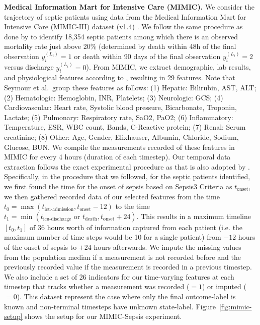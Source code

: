 \documentclass[pmlr,twocolumn,10pt]{jmlr} %
\begin{document}
\textbf{Medical Information Mart for Intensive Care (MIMIC).}
We consider the trajectory of septic patients using data from the Medical Information Mart
for Intensive Care (MIMIC-III) dataset (v1.4) \citep{johnson2018mimic}. We follow the same procedure as done by \citet{komorowski2018artificial} to identify 18,354 septic patients among which there is an observed mortality rate just above 20\% (determined by death within 48h of the final observation $y_i^{(L_i)}=1$ or death within 90 days of the final observation $y_i^{(L_i)}=2$ versus discharge $y_i^{(L_i)}=0$).
From MIMIC, we extract demographic, lab results, and physiological features according to \citet{seymour2019derivation}, resulting in 29 features. Note that Seymour et al.~group these features as follows: (1) Hepatic: Bilirubin, AST, ALT; (2) Hematologic: Hemoglobin, INR, Platelets; (3) Neurologic: GCS; (4) Cardiovascular: Heart rate, Systolic blood pressure, Bicarbonate, Troponin, Lactate; (5) Pulmonary: Respiratory rate, SaO2, PaO2; (6) Inflammatory: Temperature, ESR, WBC count, Bands, C-Reactive protein; (7) Renal: Serum creatinine; (8) Other: Age, Gender, Elixhauser, Albumin, Chloride, Sodium, Glucose, BUN. 
We compile the measurements recorded of these features in MIMIC for every 4 hours (duration of each timestep). 
Our temporal data extraction follows the exact experimental procedure as \citet{komorowski2018artificial} that is also adopted by \citet{killian2020empirical}. Specifically, in the procedure that we followed, for the septic patients identified, we first found the time for the onset of sepsis based on Sepsis3 Criteria as $t_{\text{onset}}$, we then gathered recorded data of our selected features from the time 
$t_0 = \max(t_{\text{icu-admission}}, t_{\text{onset}}-12)$ to the time $t_1 = \min(t_{\text{icu-discharge}} \text{ or } t_{\text{death}}, t_{\text{onset}}+24)$. This results in a maximum timeline $[t_0, t_1]$ of 36 hours worth of information captured from each patient (i.e. the maximum number of time steps would be 10 for a single patient) from $-12$ hours of the onset of sepsis to $+24$ hours afterwards.
We impute the missing values from the population median if a measurement is not recorded before and the previously recorded value if the measurement is recorded in a previous timestep. 
We also include a set of 26 indicators for our time-varying features at each timestep that tracks whether a measurement was recorded ($=1$) or imputed ($=0$).
This dataset represent the case where only the final outcome-label is known and non-terminal timesteps have unknown state-label.
Figure~\ref{fig:mimic-setup} shows the setup for our MIMIC-Sepsis experiment.
\end{document}
